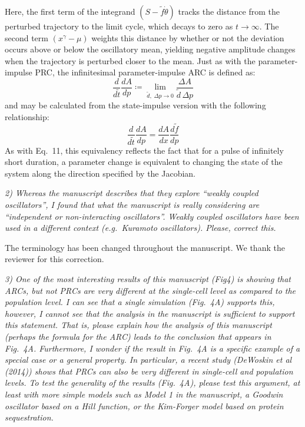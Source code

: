 \documentclass[11pt, letterpaper]{article}
\newenvironment{reviewer}{\itshape\color{gray}}{}
\newenvironment{manuscript}[1]{\begin{center}\begin{tcolorbox}[colback=green!5!white,colframe=green!75!black,width=0.8\textwidth,title={#1},breakable,fonttitle=\bfseries]}{\end{tcolorbox}\end{center}}
\begin{document}
\begin{manuscript}{Page 10}
Here, the first term of the integrand $(S - \tilde{f}\dot{\theta})$ tracks the distance from the perturbed trajectory to the limit cycle, which decays to zero as $t \to \infty$.
The second term $(x^\gamma - \mu)$ weights this distance by whether or not the deviation occurs above or below the oscillatory mean, yielding negative amplitude changes when the trajectory is perturbed closer to the mean.
Just as with the parameter-impulse PRC, the infinitesimal parameter-impulse ARC is defined as:
\begin{equation}
  \frac{d}{d\tilde{t}}\frac{dA}{dp} \coloneqq \lim_{\tilde{d},\; \Delta p \to 0}
  \frac{\Delta A}{\tilde{d}\, \Delta p}
  \tag{31}
\end{equation}
and may be calculated from the state-impulse version with the following relationship:
\begin{equation}
  \frac{d}{d\tilde{t}}\frac{dA}{dp} = \frac{dA}{dx}\frac{d\tilde{f}}{dp}
  \tag{32}
\end{equation}
As with Eq.~11, this equivalency reflects the fact that for a pulse of infinitely short duration, a parameter change is equivalent to changing the state of the system along the direction specified by the Jacobian.
\end{manuscript}

\begin{reviewer}
2) Whereas the manuscript describes that they explore ``weakly coupled oscillators'', I found that what the manuscript is really considering are ``independent or non-interacting oscillators''.
Weakly coupled oscillators have been used in a different context (e.g.\ Kuramoto oscillators).
Please, correct this.
\end{reviewer}
 
The terminology has been changed throughout the manuscript.
We thank the reviewer for this correction.

\begin{reviewer}
3) One of the most interesting results of this manuscript (Fig4) is showing that ARCs, but not PRCs are very different at the single-cell level as compared to the population level.
I can see that a single simulation (Fig.~4A) supports this, however, I cannot see that the analysis in the manuscript is sufficient to support this statement.
That is, please explain how the analysis of this manuscript (perhaps the formula for the ARC) leads to the conclusion that appears in Fig.~4A.
Furthermore, I wonder if the result in Fig.~4A is a specific example of a special case or a general property.
In particular, a recent study (DeWoskin et al (2014)) shows that PRCs can also be very different in single-cell and population levels.
To test the generality of the results (Fig.~4A), please test this argument, at least with more simple models such as Model 1 in the manuscript, a Goodwin oscillator based on a Hill function, or the Kim-Forger model based on protein sequestration.
\end{reviewer}
 
\end{document}
